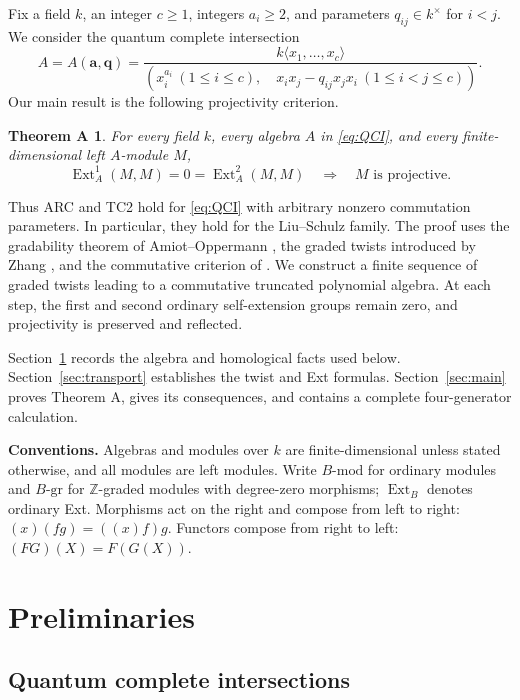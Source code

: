 \documentclass[11pt,a4paper]{article}
\numberwithin{equation}{section}
\theoremstyle{definition}
\theoremstyle{plain}
\newtheorem*{theoremA}{Theorem A}
\theoremstyle{remark}
\DeclareMathOperator{\Ext}{Ext}
\newcommand{\Z}{\mathbb Z}
\newcommand{\gmod}[1]{#1\text{-}\mathrm{gr}}
\newcommand{\umod}[1]{#1\text{-}\mathrm{mod}}
\begin{document}
Fix a field \(k\), an integer \(c\geq1\), integers \(a_i\geq2\), and
parameters \(q_{ij}\in k^\times\) for \(i<j\). We consider the quantum
complete intersection
\begin{equation}\label{eq:QCI}
 A=A(\mathbf a,\mathbf q)=
 \frac{k\langle x_1,\ldots,x_c\rangle}
 {(x_i^{a_i}\ (1\leq i\leq c),\quad
   x_ix_j-q_{ij}x_jx_i\ (1\leq i<j\leq c))}.
\end{equation}
Our main result is the following projectivity criterion.

\begin{theoremA}
For every field \(k\), every algebra \(A\) in \eqref{eq:QCI}, and every
finite-dimensional left \(A\)-module \(M\),
\[
 \Ext_A^1(M,M)=0=\Ext_A^2(M,M)
 \quad\Longrightarrow\quad M\text{ is projective}.
\]
\end{theoremA}

Thus ARC and TC2 hold for \eqref{eq:QCI} with arbitrary nonzero
commutation parameters. In particular, they hold for the Liu--Schulz
family. The proof uses the gradability theorem of Amiot--Oppermann
\cite[Corollary 4.5]{AO13}, the graded twists introduced by Zhang
\cite{Zhang96}, and the commutative criterion of
\cite[Theorem 4.2]{AB00}. We construct a finite sequence of graded twists leading to a commutative truncated polynomial algebra. At each step, the first and second ordinary self-extension groups remain zero, and projectivity is preserved and reflected.

Section~\ref{sec:prelim} records the algebra and homological facts used
below. Section~\ref{sec:transport} establishes the twist and Ext formulas.
Section~\ref{sec:main} proves Theorem A, gives its consequences, and
contains a complete four-generator calculation.

\medskip\noindent\textbf{Conventions.}
Algebras and modules over \(k\) are finite-dimensional unless stated
otherwise, and all modules are left modules. Write \(\umod{B}\) for
ordinary modules and \(\gmod{B}\) for \(\Z\)-graded modules with
degree-zero morphisms; \(\Ext_B\) denotes ordinary Ext. Morphisms act on
the right and compose from left to right:
\((x)(fg)=((x)f)g\). Functors compose from right to left:
\((FG)(X)=F(G(X))\).

\section{Preliminaries}\label{sec:prelim}

\subsection{Quantum complete intersections}
\end{document}
